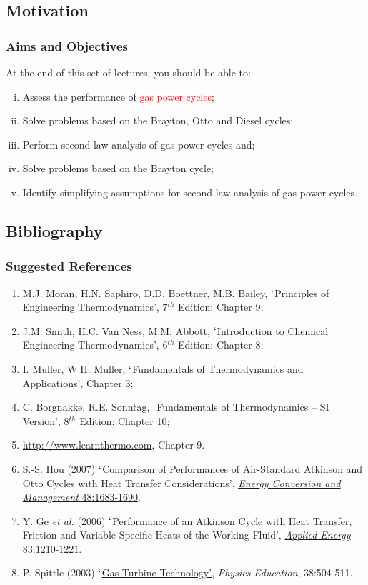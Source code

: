 \documentclass[10pt,compress]{beamer}
\newcommand{\red}{\textcolor{red}}
\begin{document}
\subsection{Motivation}
\begin{frame}
 \frametitle{Aims and Objectives}
 At the end of this set of lectures, you should be able to:
 \begin{enumerate}[(i)]
  \item <1-> Assess the performance of \red{gas power cycles};
  \item <2-> Solve problems based on the Brayton, Otto and Diesel cycles;
  \item <3-> Perform second-law analysis of gas power cycles and;
  \item <4-> Solve problems based on the Brayton cycle;
  \item <5-> Identify simplifying assumptions for second-law analysis of gas power cycles.
 \end{enumerate}
\end{frame}


\subsection{Bibliography} 
\begin{frame}
 \frametitle{Suggested References}
  \begin{enumerate}[1]\scriptsize
   \item M.J. Moran, H.N. Saphiro, D.D. Boettner, M.B. Bailey, $\lq$Principles of Engineering Thermodynamics',  7$^{th}$ Edition: Chapter 9;
   \item J.M. Smith, H.C. Van Ness, M.M. Abbott, $\lq$Introduction to Chemical Engineering Thermodynamics', 6$^{th}$ Edition: Chapter 8;
   \item I. Muller, W.H. Muller, $\lq$Fundamentals of Thermodynamics and Applications', Chapter 3;
   \item C. Borgnakke, R.E. Sonntag, $\lq$Fundamentals of Thermodynamics -- SI Version', 8$^{th}$ Edition: Chapter 10;
   \item \href{http://www.learnthermo.com}{http://www.learnthermo.com}, Chapter 9.
   \item S.-S. Hou (2007) $\lq$Comparison of Performances of Air-Standard Atkinson and Otto Cycles with Heat Transfer Considerations', \href{http://dx.doi.org/10.1016/j.enconman.2006.11.001}{{\it Energy Conversion and Management} 48:1683-1690}.
   \item Y. Ge {\it et al.} (2006) $\lq$Performance of an Atkinson Cycle with Heat Transfer, Friction and Variable Specific-Heats of the Working Fluid', \href{http://dx.doi.org/10.1016/j.apenergy.2005.12.003}{{\it Applied Energy} 83:1210-1221}.
   \item P. Spittle (2003) \href{http://dx.doi.org/10.1088/0031-9120/38/6/002}{$\lq$Gas Turbine Technology'}, {\it Physics Education}, 38:504-511.
  \end{enumerate}
\end{frame}
\end{document}
